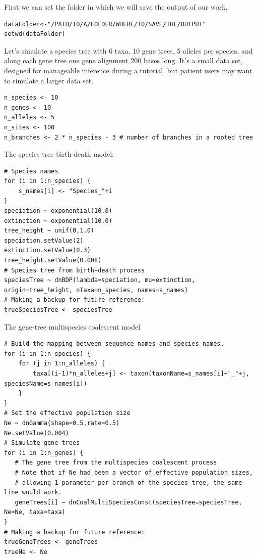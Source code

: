 \documentclass[11pt]{article}
\begin{document}
{\begin{framed}
First we can set the folder in which we will save the output of our work.
 {\tt \begin{snugshade*}
\begin{lstlisting}
dataFolder<-"/PATH/TO/A/FOLDER/WHERE/TO/SAVE/THE/OUTPUT"
setwd(dataFolder)
\end{lstlisting}
\end{snugshade*}}

Let's simulate a species tree with 6 taxa, 10 gene trees, 5 alleles per species, and along each gene tree one gene alignment 200 bases long.
It's a small data set, designed for manageable inference during a tutorial, but patient users may want to simulate a larger data set.

 {\tt \begin{snugshade*}
\begin{lstlisting}
n_species <- 10
n_genes <- 10
n_alleles <- 5
n_sites <- 100
n_branches <- 2 * n_species - 3 # number of branches in a rooted tree
\end{lstlisting}
\end{snugshade*}}

The species-tree birth-death model:

 {\tt \begin{snugshade*}
\begin{lstlisting}
# Species names
for (i in 1:n_species) {
	s_names[i] <- "Species_"+i
}
speciation ~ exponential(10.0)
extinction ~ exponential(10.0)
tree_height ~ unif(0,1.0)
speciation.setValue(2)
extinction.setValue(0.3)
tree_height.setValue(0.008)
# Species tree from birth-death process
speciesTree ~ dnBDP(lambda=speciation, mu=extinction, origin=tree_height, nTaxa=n_species, names=s_names)
# Making a backup for future reference:
trueSpeciesTree <- speciesTree
\end{lstlisting}
\end{snugshade*}}

The gene-tree multispecies coalescent model
 {\tt \begin{snugshade*}
\begin{lstlisting}
# Build the mapping between sequence names and species names.
for (i in 1:n_species) {
	for (j in 1:n_alleles) {
		taxa[(i-1)*n_alleles+j] <- taxon(taxonName=s_names[i]+"_"+j, speciesName=s_names[i])
	}
}
# Set the effective population size
Ne ~ dnGamma(shape=0.5,rate=0.5)
Ne.setValue(0.004)
# Simulate gene trees
for (i in 1:n_genes) {
   # The gene tree from the multispecies coalescent process
   # Note that if Ne had been a vector of effective population sizes, 
   # allowing 1 parameter per branch of the species tree, the same line would work.
   geneTrees[i] ~ dnCoalMultiSpeciesConst(speciesTree=speciesTree, Ne=Ne, taxa=taxa)
}
# Making a backup for future reference:
trueGeneTrees <- geneTrees
trueNe <- Ne
\end{lstlisting}
\end{snugshade*}}


\end{framed}}
\end{document}
